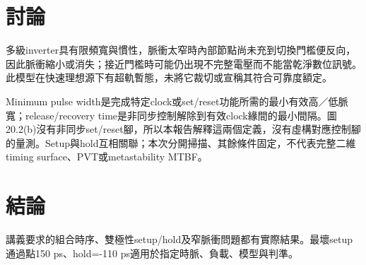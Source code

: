 \section{討論}
多級inverter具有限頻寬與慣性，脈衝太窄時內部節點尚未充到切換門檻便反向，因此脈衝縮小或消失；接近門檻時可能仍出現不完整電壓而不能當乾淨數位訊號。此模型在快速理想源下有超軌暫態，未將它裁切或宣稱其符合可靠度額定。

Minimum pulse width是完成特定clock或set/reset功能所需的最小有效高／低脈寬；release/recovery time是非同步控制解除到有效clock緣間的最小間隔。圖20.2(b)沒有非同步set/reset腳，所以本報告解釋這兩個定義，沒有虛構對應控制腳的量測。Setup與hold互相關聯；本次分開掃描、其餘條件固定，不代表完整二維timing surface、PVT或metastability MTBF。

\section{結論}
講義要求的組合時序、雙極性setup/hold及窄脈衝問題都有實際結果。最壞setup通過點150 ps、hold=-110 ps適用於指定時脈、負載、模型與判準。
